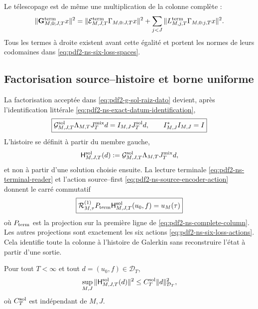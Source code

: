 Le télescopage est de même une multiplication de la colonne complète :
\begin{equation}\label{eq:pdf2-ns-global-column-isometry}
 \|\mathbf G_{M,0;J,T}^{\rm term}x\|^2
 =\|\mathcal E_{M,J,T}^{\rm term}\Gamma_{M,0:J,T}x\|^2
 +\sum_{j<J}\|L_{M,j,T}^{\rm term}
                  \Gamma_{M,0:j,T}x\|^2.
\end{equation}
Tous les termes à droite existent avant cette égalité et portent les
normes de leurs codomaines dans \eqref{eq:pdf2-ns-six-loss-spaces}.

\subsection{Factorisation source--histoire et borne uniforme}

La factorisation acceptée dans
\eqref{eq:pdf2-g-sol-raiz-dato} devient, après l'identification littérale
\eqref{eq:pdf2-ns-exact-datum-identification},
\begin{equation}\label{eq:pdf2-ns-source-colligation}
 \boxed{\begin{gathered}
 \mathcal G_{M,J,T}^{\rm sol}\Lambda_{M,T}J_T^{\rm mix}d
 =I_{M,J}J_T^{\rm sol}d,
 \qquad I_{M,J}^*I_{M,J}=I
 \end{gathered}}
\end{equation}
L'histoire se définit à partir du membre gauche,
\begin{equation}\label{eq:pdf2-ns-root-factorization}
 \mathsf H_{M,J,T}^{\rm sol}(d):=
 \mathcal G_{M,J,T}^{\rm sol}\Lambda_{M,T}J_T^{\rm mix}d,
\end{equation}
et non à partir d'une solution choisie ensuite. La lecture terminale
\eqref{eq:pdf2-ns-terminal-reader} et l'action source--first
\eqref{eq:pdf2-ns-source-encoder-action} donnent le carré commutatif
\begin{equation}\label{eq:pdf2-ns-data-history-commutation}
 \boxed{\begin{gathered}
 \mathcal R_{M,\tau}^{(1)}P_{\rm term}
 \mathsf H_{M,J,T}^{\rm sol}(u_0,f)=u_M(\tau)
 \end{gathered}}
\end{equation}
où $P_{\rm term}$ est la projection sur la première ligne de
\eqref{eq:pdf2-ns-complete-column}. Les autres projections sont exactement les
six actions \eqref{eq:pdf2-ns-six-loss-actions}. Cela identifie toute la
colonne à l'histoire de Galerkin sans reconstruire l'état à partir d'une sortie.

\begin{theorem}
\label{thm:pdf2-ns-root-uniform}
Pour tout $T<\infty$ et tout $d=(u_0,f)\in\mathcal D_T$,
\begin{equation}\label{eq:pdf2-ns-root-bound}
 \sup_{M,J}\|\mathsf H_{M,J,T}^{\rm sol}(d)\|^2
 \le C_T^{\rm sol}\|d\|_{\mathcal D_T}^2,
\end{equation}
où $C_T^{\rm sol}$ est indépendant de $M,J$.
\end{theorem}

